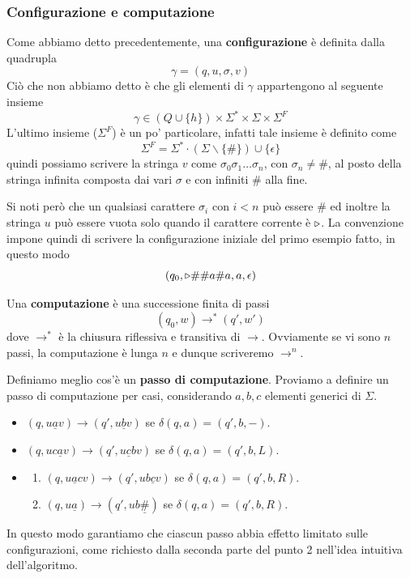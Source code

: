 \subsubsection{Configurazione e computazione}
Come abbiamo detto precedentemente, una \textbf{configurazione}
è definita dalla quadrupla
\[ \gamma = (q, u, \sigma, v) \]
Ciò che non abbiamo detto è che gli elementi di $\gamma$
appartengono al seguente insieme
\[
	\gamma \in (Q \cup \{ h \}) \times
	\Sigma^* \times \Sigma \times \Sigma^F
\]
L'ultimo insieme ($\Sigma^F$) è un po' particolare, infatti
tale insieme è definito come
\[
	\Sigma^F = \Sigma^* \cdot \left( \Sigma \backslash
	\{ \# \} \right) \cup \{ \epsilon \}
\]
quindi possiamo scrivere la stringa $v$ come
$\sigma_0 \sigma_1 \dots \sigma_n$, con $\sigma_n \neq \#$,
al posto della stringa infinita composta dai vari $\sigma$ e
con infiniti $\#$ alla fine.

Si noti però che un qualsiasi carattere $\sigma_i$ con $i < n$
può essere $\#$ ed inoltre la stringa $u$ può essere vuota
solo quando il carattere corrente è $\triangleright$. La convenzione
impone quindi di scrivere la configurazione iniziale del primo
esempio fatto, in questo modo
\[ (q_0, \triangleright \# \# a \# a, a, \epsilon) \]

\begin{definition}
	Una \textbf{computazione} è una successione finita di
	passi
	\[ (q_0, w) \to^* (q', w') \]
	dove $\to^*$ è la chiusura riflessiva e transitiva di
	$\to$. Ovviamente se vi sono $n$ passi, la computazione
	è lunga $n$ e dunque scriveremo $\to^n$.
\end{definition}

Definiamo meglio cos'è un \textbf{passo di computazione}.
Proviamo a definire un passo di computazione per casi,
considerando $a, b, c$ elementi generici di $\Sigma$.
\begin{itemize}
	\item $(q, u \underline{a} v) \to (q', u \underline{b} v)$
	      se $\delta (q, a) = (q', b, -)$.
	\item $(q, u c \underline{a} v) \to
		      (q', u \underline{c} b v)$
	      se $\delta (q, a) = (q', b, L)$.
	\item \begin{enumerate}
		      \item $(q, u \underline{a} c v) \to
			            (q', u b \underline{c} v)$
		            se $\delta (q, a) = (q', b, R)$.
		      \item $(q, u \underline{a}) \to
			            (q', u b \underline{\#})$
		            se $\delta (q, a) = (q', b, R)$.
	      \end{enumerate}
\end{itemize}
In questo modo garantiamo che ciascun passo abbia effetto
limitato sulle configurazioni, come richiesto dalla seconda
parte del punto 2 nell'idea intuitiva dell'algoritmo.

